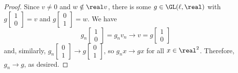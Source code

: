 \begin{proof}
Since $v \neq 0$ and $w \notin \real v$, there is some $g
\in \GL(\ell,\real)$ with $g \! \left[ \begin{smallmatrix} 1 \\ 0 \end{smallmatrix} \right] = v$ and $g \! \left[ \begin{smallmatrix} 0 \\ 1 \end{smallmatrix} \right] = w$.
We have 
 $$ g_n \! \left[ \begin{smallmatrix} 1 \\ 0 \end{smallmatrix} \right] = g_n v_n \to v = g \! \left[ \begin{smallmatrix} 1 \\ 0 \end{smallmatrix} \right] $$
 and, similarly, $g_n \!  \left[ \begin{smallmatrix} 0 \\ 1 \end{smallmatrix} \right] \to g \! \left[ \begin{smallmatrix} 0 \\ 1 \end{smallmatrix} \right]$, so $g_n x \to gx$
for all $x \in \real^2$. Therefore, $g_n \to g$, as desired.
 \end{proof}
 

